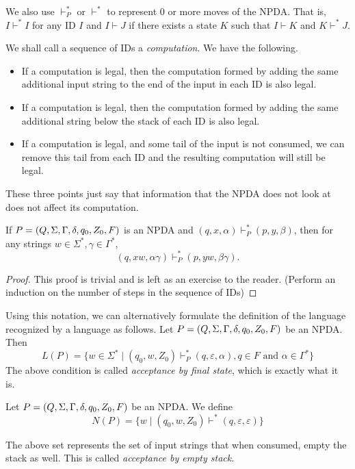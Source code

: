 We also use $\vdash^*_P$ or $\vdash^*$ to represent $0$ or more moves of the NPDA. That is, $I\vdash^* I$ for any ID $I$ and $I\vdash J$ if there exists a state $K$ such that $I\vdash K$ and $K\vdash^* J$.

\vspace{3mm}
We shall call a sequence of IDs a \textit{computation}. We have the following.
\begin{itemize}
    \item If a computation is legal, then the computation formed by adding the same additional input string to the end of the input in each ID is also legal.
    \item If a computation is legal, then the computation formed by adding the same additional string below the stack of each ID is also legal.
    \item If a computation is legal, and some tail of the input is not consumed, we can remove this tail from each ID and the resulting computation will still be legal.
\end{itemize}

These three points just say that information that the NPDA does not look at does not affect its computation.

\begin{theorem}
\label{dontreaddontcare}
If $P=(Q,\Sigma,\Gamma,\delta,q_0,Z_0,F)$ is an NPDA and $(q,x,\alpha)\vdash^*_P(p,y,\beta)$, then for any strings $w\in\Sigma^*, \gamma\in\Gamma^*$, $$(q,xw,\alpha\gamma)\vdash^*_P(p,yw,\beta\gamma).$$
\end{theorem}
\begin{proof}
This proof is trivial and is left as an exercise to the reader. (Perform an induction on the number of steps in the sequence of IDs)
\end{proof}

Using this notation, we can alternatively formulate the definition of the language recognized by a language as follows.
Let $P=(Q,\Sigma,\Gamma,\delta,q_0,Z_0,F)$ be an NPDA. Then
$$L(P)=\{w\in \Sigma^* \mid (q_0,w,Z_0)\vdash^*_P(q,\varepsilon,\alpha), q\in F\text{ and }\alpha\in\Gamma^*\}$$
The above condition is called \textit{acceptance by final state}, which is exactly what it is.
\begin{definition}
Let $P=(Q,\Sigma,\Gamma,\delta,q_0,Z_0,F)$ be an NPDA. We define
$$N(P)=\{w\mid (q_0,w,Z_0)\vdash^*(q,\varepsilon,\varepsilon)\}$$
\end{definition}


The above set represents the set of input strings that when consumed, empty the stack as well. This is called \textit{acceptance by empty stack}.

